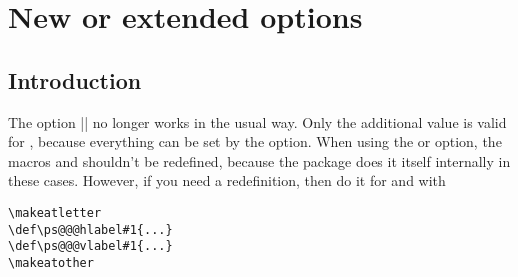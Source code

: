 \documentclass[11pt,english,BCOR10mm,DIV12,bibliography=totoc,parskip=false,smallheadings
    headexclude,footexclude,oneside,dvipsnames,svgnames]{pst-doc}
\begin{document}
\section{New or extended  options}
\subsection{Introduction}
The option || no longer works in the
usual way. Only the additional value  is valid for
, because everything can be set by the
 option. When using the  or
 option, the macros  and
 shouldn't be redefined, because the package does
it itself internally in these cases. However, if you need a
redefinition, then do it for  and
 with

\begin{lstlisting}[style=syntax]
\makeatletter
\def\ps@@@hlabel#1{...}
\def\ps@@@vlabel#1{...}
\makeatother
\end{lstlisting}
\end{document}
